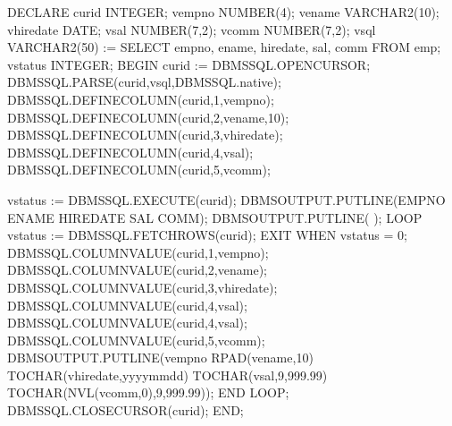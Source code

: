 \documentclass[letterpaper,10pt,english,openany,oneside]{sphinxmanual}
\begin{document}
%
\begin{sphinxVerbatim}[commandchars=\\\{\}]
DECLARE
    curid           INTEGER;
    v\PYGZus{}empno         NUMBER(4);
    v\PYGZus{}ename         VARCHAR2(10);
    v\PYGZus{}hiredate      DATE;
    v\PYGZus{}sal           NUMBER(7,2);
    v\PYGZus{}comm          NUMBER(7,2);
    v\PYGZus{}sql           VARCHAR2(50) := \PYGZsq{}SELECT empno, ename, hiredate, sal, \PYGZsq{} \textbar{}\textbar{}
                                    \PYGZsq{}comm FROM emp\PYGZsq{};
    v\PYGZus{}status        INTEGER;
BEGIN
    curid := DBMS\PYGZus{}SQL.OPEN\PYGZus{}CURSOR;
    DBMS\PYGZus{}SQL.PARSE(curid,v\PYGZus{}sql,DBMS\PYGZus{}SQL.native);
    DBMS\PYGZus{}SQL.DEFINE\PYGZus{}COLUMN(curid,1,v\PYGZus{}empno);
    DBMS\PYGZus{}SQL.DEFINE\PYGZus{}COLUMN(curid,2,v\PYGZus{}ename,10);
    DBMS\PYGZus{}SQL.DEFINE\PYGZus{}COLUMN(curid,3,v\PYGZus{}hiredate);
    DBMS\PYGZus{}SQL.DEFINE\PYGZus{}COLUMN(curid,4,v\PYGZus{}sal);
    DBMS\PYGZus{}SQL.DEFINE\PYGZus{}COLUMN(curid,5,v\PYGZus{}comm);

    v\PYGZus{}status := DBMS\PYGZus{}SQL.EXECUTE(curid);
    DBMS\PYGZus{}OUTPUT.PUT\PYGZus{}LINE(\PYGZsq{}EMPNO  ENAME       HIREDATE    SAL       COMM\PYGZsq{});
    DBMS\PYGZus{}OUTPUT.PUT\PYGZus{}LINE(\PYGZsq{}\PYGZhy{}\PYGZhy{}\PYGZhy{}\PYGZhy{}\PYGZhy{}  \PYGZhy{}\PYGZhy{}\PYGZhy{}\PYGZhy{}\PYGZhy{}\PYGZhy{}\PYGZhy{}\PYGZhy{}\PYGZhy{}\PYGZhy{}  \PYGZhy{}\PYGZhy{}\PYGZhy{}\PYGZhy{}\PYGZhy{}\PYGZhy{}\PYGZhy{}\PYGZhy{}\PYGZhy{}\PYGZhy{}  \PYGZhy{}\PYGZhy{}\PYGZhy{}\PYGZhy{}\PYGZhy{}\PYGZhy{}\PYGZhy{}\PYGZhy{}  \PYGZsq{} \textbar{}\textbar{}
        \PYGZsq{}\PYGZhy{}\PYGZhy{}\PYGZhy{}\PYGZhy{}\PYGZhy{}\PYGZhy{}\PYGZhy{}\PYGZhy{}\PYGZsq{});
    LOOP
        v\PYGZus{}status := DBMS\PYGZus{}SQL.FETCH\PYGZus{}ROWS(curid);
        EXIT WHEN v\PYGZus{}status = 0;
        DBMS\PYGZus{}SQL.COLUMN\PYGZus{}VALUE(curid,1,v\PYGZus{}empno);
        DBMS\PYGZus{}SQL.COLUMN\PYGZus{}VALUE(curid,2,v\PYGZus{}ename);
        DBMS\PYGZus{}SQL.COLUMN\PYGZus{}VALUE(curid,3,v\PYGZus{}hiredate);
        DBMS\PYGZus{}SQL.COLUMN\PYGZus{}VALUE(curid,4,v\PYGZus{}sal);
        DBMS\PYGZus{}SQL.COLUMN\PYGZus{}VALUE(curid,4,v\PYGZus{}sal);
        DBMS\PYGZus{}SQL.COLUMN\PYGZus{}VALUE(curid,5,v\PYGZus{}comm);
        DBMS\PYGZus{}OUTPUT.PUT\PYGZus{}LINE(v\PYGZus{}empno \textbar{}\textbar{} \PYGZsq{}   \PYGZsq{} \textbar{}\textbar{} RPAD(v\PYGZus{}ename,10) \textbar{}\textbar{} \PYGZsq{}  \PYGZsq{} \textbar{}\textbar{}
            TO\PYGZus{}CHAR(v\PYGZus{}hiredate,\PYGZsq{}yyyy\PYGZhy{}mm\PYGZhy{}dd\PYGZsq{}) \textbar{}\textbar{} \PYGZsq{} \PYGZsq{} \textbar{}\textbar{}
            TO\PYGZus{}CHAR(v\PYGZus{}sal,\PYGZsq{}9,999.99\PYGZsq{}) \textbar{}\textbar{} \PYGZsq{} \PYGZsq{} \textbar{}\textbar{}
            TO\PYGZus{}CHAR(NVL(v\PYGZus{}comm,0),\PYGZsq{}9,999.99\PYGZsq{}));
    END LOOP;
    DBMS\PYGZus{}SQL.CLOSE\PYGZus{}CURSOR(curid);
END;


\end{sphinxVerbatim}
\end{document}
